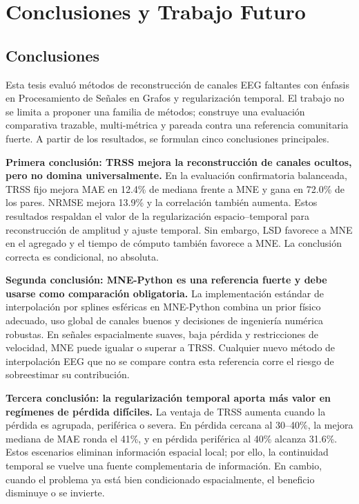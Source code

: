 \chapter{Conclusiones y Trabajo Futuro}
\label{ch:conclusiones}

\section{Conclusiones}

Esta tesis evaluó métodos de reconstrucción de canales EEG faltantes con énfasis en Procesamiento de Señales en Grafos y regularización temporal. El trabajo no se limita a proponer una familia de métodos; construye una evaluación comparativa trazable, multi-métrica y pareada contra una referencia comunitaria fuerte. A partir de los resultados, se formulan cinco conclusiones principales.

\textbf{Primera conclusión: TRSS mejora la reconstrucción de canales ocultos, pero no domina universalmente.} En la evaluación confirmatoria balanceada, TRSS fijo mejora MAE en 12.4\% de mediana frente a MNE y gana en 72.0\% de los pares. NRMSE mejora 13.9\% y la correlación también aumenta. Estos resultados respaldan el valor de la regularización espacio--temporal para reconstrucción de amplitud y ajuste temporal. Sin embargo, LSD favorece a MNE en el agregado y el tiempo de cómputo también favorece a MNE. La conclusión correcta es condicional, no absoluta.

\textbf{Segunda conclusión: MNE-Python es una referencia fuerte y debe usarse como comparación obligatoria.} La implementación estándar de interpolación por splines esféricas en MNE-Python combina un prior físico adecuado, uso global de canales buenos y decisiones de ingeniería numérica robustas. En señales espacialmente suaves, baja pérdida y restricciones de velocidad, MNE puede igualar o superar a TRSS. Cualquier nuevo método de interpolación EEG que no se compare contra esta referencia corre el riesgo de sobreestimar su contribución.

\textbf{Tercera conclusión: la regularización temporal aporta más valor en regímenes de pérdida difíciles.} La ventaja de TRSS aumenta cuando la pérdida es agrupada, periférica o severa. En pérdida cercana al 30--40\%, la mejora mediana de MAE ronda el 41\%, y en pérdida periférica al 40\% alcanza 31.6\%. Estos escenarios eliminan información espacial local; por ello, la continuidad temporal se vuelve una fuente complementaria de información. En cambio, cuando el problema ya está bien condicionado espacialmente, el beneficio disminuye o se invierte.

